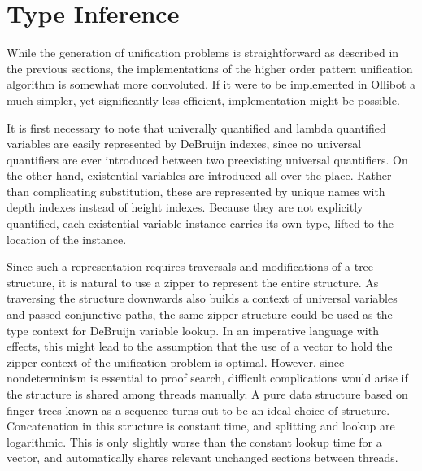 \section{Type Inference}

While the generation of unification problems is straightforward as described in the previous
sections, the implementations of the higher order pattern unification algorithm
is somewhat more convoluted. If it were to be implemented in Ollibot \citep{pfenning2009substructural} a much simpler, 
yet significantly less efficient, implementation might be possible.

It is first necessary to note that univerally quantified and lambda quantified variables
are easily represented by DeBruijn indexes, since no universal quantifiers are ever
introduced between two preexisting universal quantifiers. On the other hand, existential
variables are introduced all over the place. Rather than complicating substitution,
these are represented by unique names with depth indexes instead of height indexes.
Because they are not explicitly quantified, each existential variable instance carries its
own type, lifted to the location of the instance.

Since such a representation requires traversals and modifications of a tree structure,
it is natural to use a zipper to represent the entire structure. As traversing the structure
downwards also builds a context of universal variables and passed conjunctive
paths, the same zipper structure could be used as the type context for DeBruijn variable
lookup. In an imperative language with effects, this might lead to the assumption that
the use of a vector to hold the zipper context of the unification problem is optimal. However,
since nondeterminism is essential to proof search, difficult complications would
arise if the structure is shared among threads manually.  A pure data structure based on
finger trees \citep{hinze2006finger} known as a sequence turns out to be an ideal choice of structure. Concatenation in this structure is constant time, and splitting and lookup are logarithmic.
This is only slightly worse than the constant lookup time for a vector, and automatically
shares relevant unchanged sections between threads.


